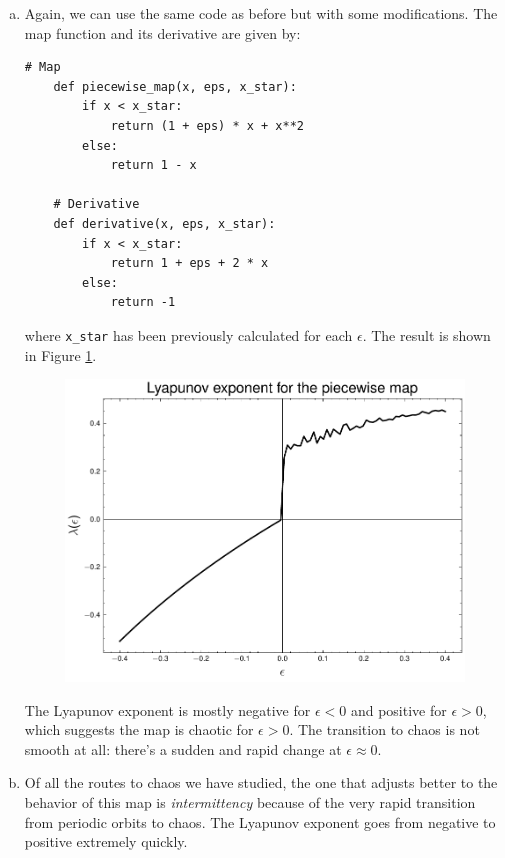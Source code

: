 \begin{enumerate}[(a)]
    \item Again, we can use the same code as before but with some modifications.
    The map function and its derivative are given by:

    \newpage

    \begin{lstlisting}[style=pythonstyle]
    # Map
    def piecewise_map(x, eps, x_star):
        if x < x_star:
            return (1 + eps) * x + x**2
        else:
            return 1 - x
        
    # Derivative
    def derivative(x, eps, x_star):
        if x < x_star:
            return 1 + eps + 2 * x
        else:
            return -1
    \end{lstlisting}

    where \texttt{x\_star} has been previously calculated for each $\epsilon$.
    The result is shown in Figure \ref{fig:2a}.
    \begin{figure}[!ht]
        \centering
        \includegraphics[scale=0.65]{images/piecewise_lya.pdf}
        \label{fig:2a}
    \end{figure}

    The Lyapunov exponent is mostly negative for $\epsilon < 0$ and positive for $\epsilon > 0$, which
    suggests the map is chaotic for $\epsilon > 0$. The transition to chaos is not smooth at all: there's a 
    sudden and rapid change at $\epsilon \approx 0$.
    \item Of all the routes to chaos we have studied, the one that adjusts better to the behavior of this map is
    \textit{intermittency} because of the very rapid transition from periodic orbits to chaos. The Lyapunov exponent goes from negative
    to positive extremely quickly.
\end{enumerate}

